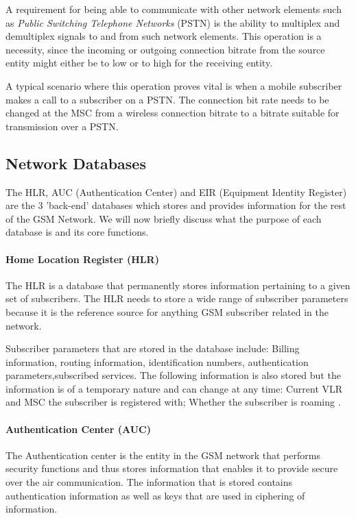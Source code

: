 A requirement for being able to communicate with other network elements such as \emph{Public Switching Telephone Networks} (PSTN) is the ability to multiplex and demultiplex signals to and from such network elements. This operation is a necessity, since the incoming or outgoing connection bitrate from the source entity might either be to low or to high for the receiving entity.

A typical scenario where this operation proves vital is when a mobile subscriber makes a call to a subscriber on a PSTN. The connection bit rate needs to be changed at the MSC from a wireless connection bitrate to a bitrate suitable for transmission over a PSTN.

\subsection{Network Databases}
The HLR, AUC (Authentication Center) and EIR (Equipment Identity Register) are the 3 'back-end' databases which stores and provides information for the rest of the GSM Network. We will now briefly discuss what the purpose of each database is and its core functions.

\paragraph{Home Location Register (HLR)}
The HLR is a database that permanently stores information pertaining to a given set of subscribers. The HLR needs to store a wide range of subscriber parameters because it is the reference source for anything GSM subscriber related in the network. 

Subscriber parameters that are stored in the database include: Billing information, routing information, identification numbers, authentication parameters,subscribed services. The following information is also stored but the information is of a temporary nature and can change at any time: Current VLR and MSC the subscriber is registered with; Whether the subscriber is roaming \cite{GSMSysEngin}.

\paragraph{Authentication Center (AUC)}
The Authentication center is the entity in the GSM network that performs security functions and thus stores information that enables it to provide secure over the air communication\cite{GSM92,GSMSysEngin}. The information that is stored contains authentication information as well as keys that are used in ciphering of information\cite{GSM92,GSMSysEngin}.

